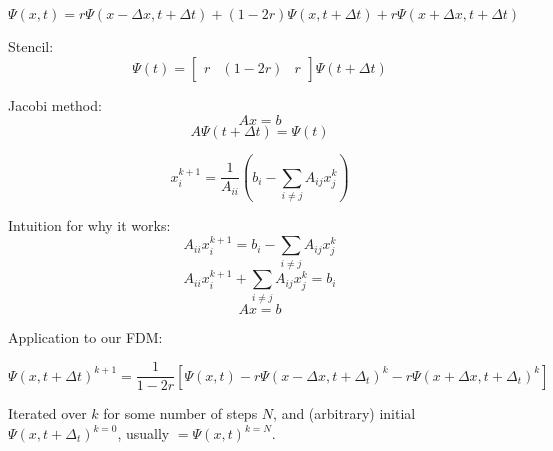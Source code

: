 \documentclass[12pt]{article}
\begin{document}
\[ 
    \Psi(x, t)
    = r\Psi(x - \Delta x, t + \Delta t) + (1 - 2r)\Psi(x, t + \Delta t) + r\Psi(x + \Delta x, t + \Delta t)
\]

Stencil:
\[ \Psi(t) = \begin{bmatrix} r & (1 - 2r) & r \end{bmatrix} \Psi(t + \Delta t) \]


Jacobi method:
\[ Ax = b \]
\[ A \Psi(t + \Delta t) = \Psi(t) \]

\[ x^{k + 1}_i = \frac{1}{A_{ii}} \left( b_i - \sum_{i \ne j} A_{ij} x_j^k \right) \]

Intuition for why it works:
\[ A_{ii} x^{k + 1}_i = b_i - \sum_{i \ne j} A_{ij} x_j^k \]
\[ A_{ii} x^{k + 1}_i + \sum_{i \ne j} A_{ij} x_j^k = b_i  \]
\[ Ax = b  \]

Application to our FDM:

\[ \Psi(x, t + \Delta t)^{k + 1} 
    = \frac{1}{1 - 2r} 
    \left[ 
        \Psi(x, t) 
        - r\Psi(x - \Delta x, t + \Delta_t)^{k} 
        - r\Psi(x + \Delta x, t + \Delta_t)^{k} 
    \right]
\]

Iterated over $k$ for some number of steps $N$, and (arbitrary) initial $\Psi(x, t + \Delta_t)^{k=0}$, usually $ = \Psi(x, t)^{k=N}$. 
\end{document}
